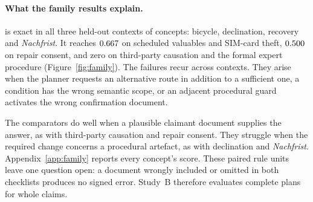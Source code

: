 \paragraph{What the family results explain.}
\casepath is exact in all three held-out contexts of \nFamExact{} concepts:
bicycle, declination, recovery and \emph{Nachfrist}. It reaches
$0.667$ on scheduled valuables and SIM-card theft,
$0.500$ on repair consent, and zero on third-party causation and
the formal expert procedure (Figure~\ref{fig:family}). The failures recur
across contexts. They arise when the planner requests an alternative route
in addition to a sufficient one, a condition has the wrong semantic scope,
or an adjacent procedural guard activates the wrong confirmation document.

The comparators do well when a plausible claimant document supplies the
answer, as with third-party causation and repair consent. They struggle
when the required change concerns a procedural artefact, as with declination
and \emph{Nachfrist}. Appendix~\ref{app:family} reports every concept's
score. These paired rule units leave one question open: a document wrongly
included or omitted in both checklists produces no signed error. Study~B
therefore evaluates complete plans for whole claims.
